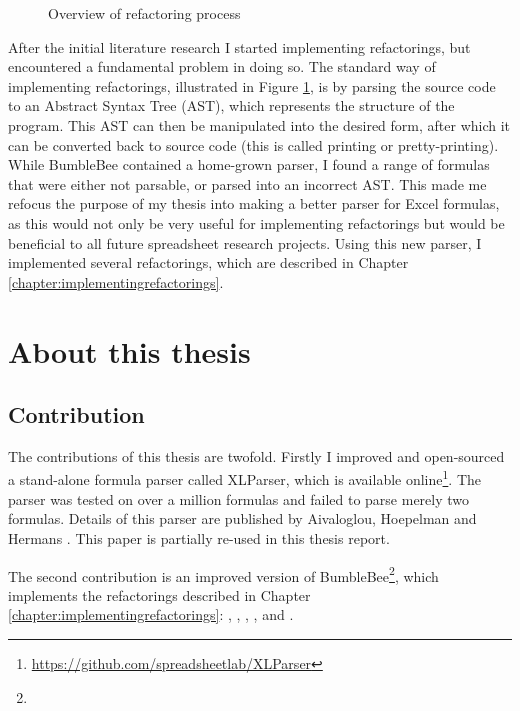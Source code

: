 \begin{figure}
\centerfloat

\caption{Overview of refactoring process}
\label{fig:refactoring-process}
\end{figure}

After the initial literature research I started implementing refactorings, but encountered a fundamental problem in doing so.
The standard way of implementing refactorings, illustrated in Figure \ref{fig:refactoring-process}, is by parsing the source code to an Abstract Syntax Tree (AST), which represents the structure of the program.
This AST can then be manipulated into the desired form, after which it can be converted back to source code (this is called printing or pretty-printing).
While BumbleBee contained a home-grown parser, I found a range of formulas that were either not parsable, or parsed into an incorrect AST.
This made me refocus the purpose of my thesis into making a better parser for Excel formulas, as this would not only be very useful for implementing refactorings but would be beneficial to all future spreadsheet research projects.
Using this new parser, I implemented several refactorings, which are described in Chapter \ref{chapter:implementingrefactorings}.

\section{About this thesis}

\subsection{Contribution}

The contributions of this thesis are twofold.
Firstly I improved and open-sourced a stand-alone formula parser called XLParser, which is available online\footnote{\url{https://github.com/spreadsheetlab/XLParser}}.
The parser was tested on over a million formulas and failed to parse merely two formulas.
Details of this parser are published by Aivaloglou, Hoepelman and Hermans \cite{xlparser}.
This paper is partially re-used in this thesis report.

The second contribution is an improved version of BumbleBee\footnote{}, which implements the refactorings described in Chapter \ref{chapter:implementingrefactorings}: , , , ,  and .


